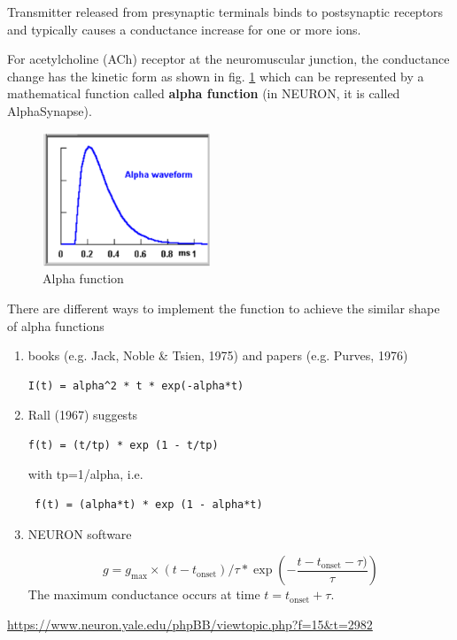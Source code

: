 Transmitter released from presynaptic terminals binds to postsynaptic receptors
and typically causes a conductance increase for one or more ions.

For acetylcholine (ACh) receptor at the neuromuscular junction, the conductance
change has the kinetic form as shown in fig. \ref{fig:alpha-function} which can
be represented by a mathematical function called {\bf alpha function} (in
NEURON, it is called AlphaSynapse).

\begin{figure}[hbt]
  \centerline{\includegraphics[height=4cm,
    angle=0]{./images/alpha-function.eps}}
  \caption{Alpha function}
\label{fig:alpha-function}
\end{figure}

There are different ways to implement the function to achieve the similar
shape of alpha functions
\begin{enumerate}
  \item books (e.g. Jack, Noble \& Tsien, 1975) and papers (e.g. Purves, 1976)

\begin{verbatim}
I(t) = alpha^2 * t * exp(-alpha*t)
\end{verbatim}

  \item  Rall (1967) suggests

\begin{verbatim}
f(t) = (t/tp) * exp (1 - t/tp)
\end{verbatim}

with tp=1/alpha, i.e.
\begin{verbatim}
 f(t) = (alpha*t) * exp (1 - alpha*t)
\end{verbatim}

  \item NEURON software

\def\onset{{\text{onset}}}
\begin{equation}
g = g_\max \times (t-t_\onset)/\tau * \exp\left(
- \frac{t-t_\onset-\tau)}{\tau}\right)
\end{equation}
The maximum conductance occurs at time $t=t_\onset + \tau$.

\end{enumerate}
\url{https://www.neuron.yale.edu/phpBB/viewtopic.php?f=15&t=2982}



